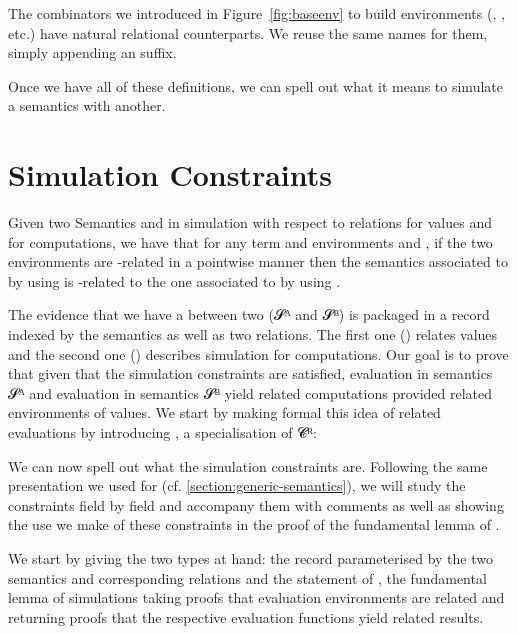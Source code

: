 The combinators we introduced in Figure~\ref{fig:baseenv} to build environments
(, , etc.) have natural relational counterparts.
We reuse the same names for them, simply appending an  suffix.


Once we have all of these definitions, we can spell out what it means to
simulate a semantics with another.

\section{Simulation Constraints}
\label{sec:simconstraints}

Given two Semantics  and  in simulation with respect to
relations  for values and  for computations, we have that
for any term  and environments  and , if the two
environments are -related in a pointwise manner then the semantics
associated to  by  using  is -related to the
one associated to  by  using .

The evidence that we have a  between two 
(𝓢ᴬ and 𝓢ᴮ) is packaged in a record indexed by the semantics as well
as two relations. The first one () relates values and the second
one () describes simulation for computations. Our goal is to prove
that given that the simulation constraints are satisfied, evaluation in
semantics 𝓢ᴬ and evaluation in semantics 𝓢ᴮ yield related computations
provided related environments of values. We start by making formal this
idea of related evaluations by introducing , a specialisation of
𝓒ᴿ:


We can now spell out what the simulation constraints are. Following the
same presentation we used for 
(cf. \cref{section:generic-semantics}), we will study the constraints field
by field and accompany them with comments as well as showing the use we make
of these constraints in the proof of the fundamental lemma of .

We start by giving the two types at hand: the  record
parameterised by the two semantics and corresponding relations and
the statement of , the fundamental lemma of simulations
taking proofs that evaluation environments are related and returning
proofs that the respective evaluation functions yield related results.

